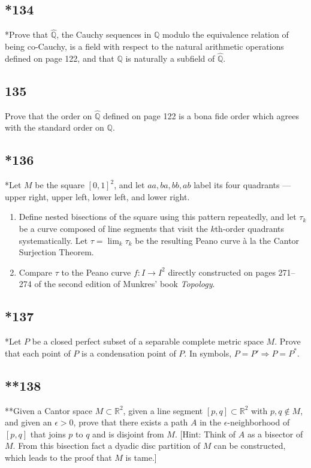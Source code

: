 \documentclass{amsart}
\begin{document}
\subsection*{*134}
*Prove that $\widehat{\mathbb{Q}}$, the Cauchy sequences in $\mathbb{Q}$ modulo the equivalence relation of being co-Cauchy, is a field with respect to the natural arithmetic operations defined on page 122, and that $\mathbb{Q}$ is naturally a subfield of $\widehat{\mathbb{Q}}$.

\subsection*{135}
Prove that the order on $\widehat{\mathbb{Q}}$ defined on page 122 is a bona fide order which agrees with the standard order on $\mathbb{Q}$.

\subsection*{*136}
*Let $M$ be the square $[0,1]^2$, and let $aa, ba, bb, ab$ label its four quadrants --- upper right, upper left, lower left, and lower right.
\begin{enumerate}[label=(\alph*)]
\item Define nested bisections of the square using this pattern repeatedly, and let $\tau_k$ be a curve composed of line segments that visit the $k$th-order quadrants systematically. Let $\tau = \lim_k \tau_k$ be the resulting Peano curve \`a la the Cantor Surjection Theorem.
\item Compare $\tau$ to the Peano curve $f : I \to I^2$ directly constructed on pages 271--274 of the second edition of Munkres' book \emph{Topology}.
\end{enumerate}

\subsection*{*137}
*Let $P$ be a closed perfect subset of a separable complete metric space $M$. Prove that each point of $P$ is a condensation point of $P$. In symbols, $P = P' \Rightarrow P = P^*$.

\subsection*{**138}
**Given a Cantor space $M \subset \mathbb{R}^2$, given a line segment $[p,q] \subset \mathbb{R}^2$ with $p,q \notin M$, and given an $\epsilon>0$, prove that there exists a path $A$ in the $\epsilon$-neighborhood of $[p,q]$ that joins $p$ to $q$ and is disjoint from $M$. [Hint: Think of $A$ as a bisector of $M$. From this bisection fact a dyadic disc partition of $M$ can be constructed, which leads to the proof that $M$ is tame.]
\end{document}
